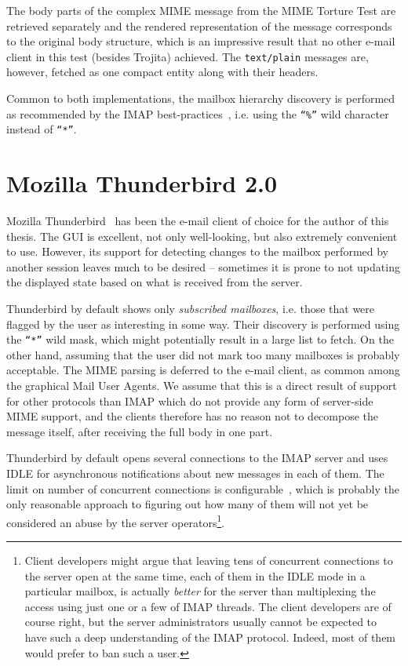 \documentclass[12pt,notitlepage]{report}
\newcommand{\trojita}{Trojita\xspace}
\begin{document}
The body parts of the complex MIME message from the MIME Torture Test are
retrieved separately and the rendered representation of the message corresponds
to the original body structure, which is an impressive result that no other
e-mail client in this test (besides \trojita) achieved.  The {\tt text/plain}
messages are, however, fetched as one compact entity along with their headers.

Common to both implementations, the mailbox hierarchy discovery is performed as
recommended by the IMAP best-practices~\cite{client-best-practices}, i.e. using
the {\tt ``\%''} wild character instead of {\tt ``*''}.

\section{Mozilla Thunderbird 2.0}

Mozilla Thunderbird~\cite{thunderbird} has been the e-mail client of choice for
the author of this thesis.  The GUI is excellent, not only well-looking, but
also extremely convenient to use.  However, its support for detecting changes to
the mailbox performed by another session leaves much to be desired -- sometimes
it is prone to not updating the displayed state based on what is received from
the server.

Thunderbird by default shows only {\em subscribed mailboxes}, i.e. those that
were flagged by the user as interesting in some way.  Their discovery is
performed using the {\tt ``*''} wild mask, which might potentially result in a
large list to fetch.  On the other hand, assuming that the user did not mark
too many mailboxes is probably acceptable.  The MIME parsing is deferred to the
e-mail client, as common among the graphical Mail User Agents.  We assume that
this is a direct result of support for other protocols than IMAP which do not
provide any form of server-side MIME support, and the clients therefore has no
reason not to decompose the message itself, after receiving the full body in one
part.

Thunderbird by default opens several connections to the IMAP server and uses
IDLE for asynchronous notifications about new messages in each of them.  The
limit on number of concurrent connections is configurable~\cite{mozilla-imap},
which is probably the only reasonable approach to figuring out how many of them
will not yet be considered an abuse by the server operators\footnote{Client
developers might argue that leaving tens of concurrent connections to the server
open at the same time, each of them in the IDLE mode in a particular mailbox, is
actually {\em better} for the server than multiplexing the access using just one
or a few of IMAP threads.  The client developers are of course right, but the
server administrators usually cannot be expected to have such a deep
understanding of the IMAP protocol.  Indeed, most of them would prefer to ban
such a user.}.
\end{document}

